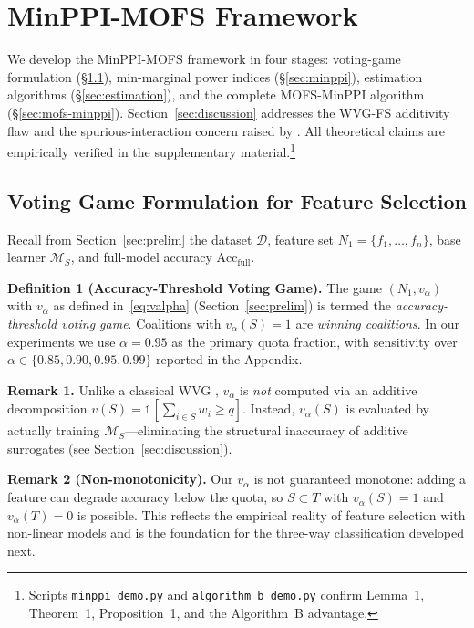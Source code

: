 \documentclass{article} %
\begin{document}
\section{MinPPI-MOFS Framework}
\label{sec:method}

We develop the MinPPI-MOFS framework in four stages: voting-game formulation (\S\ref{sec:voting-game}), min-marginal power indices (\S\ref{sec:minppi}), estimation algorithms (\S\ref{sec:estimation}), and the complete MOFS-MinPPI algorithm (\S\ref{sec:mofs-minppi}). Section~\ref{sec:discussion} addresses the WVG-FS additivity flaw and the spurious-interaction concern raised by \citet{rabitti2019shapley}. All theoretical claims are empirically verified in the supplementary material.\footnote{Scripts \texttt{minppi\_demo.py} and \texttt{algorithm\_b\_demo.py} confirm Lemma~1, Theorem~1, Proposition~1, and the Algorithm~B advantage.}

\subsection{Voting Game Formulation for Feature Selection}
\label{sec:voting-game}

Recall from Section~\ref{sec:prelim} the dataset $\mathcal{D}$, feature set $N_1 = \{f_1, \dots, f_n\}$, base learner $\mathcal{M}_S$, and full-model accuracy $\text{Acc}_{\text{full}}$.

\textbf{Definition 1 (Accuracy-Threshold Voting Game).}
The game $(N_1, v_\alpha)$ with $v_\alpha$ as defined in~\eqref{eq:valpha} (Section~\ref{sec:prelim}) is termed the \emph{accuracy-threshold voting game}. Coalitions with $v_\alpha(S) = 1$ are \emph{winning coalitions}. In our experiments we use $\alpha = 0.95$ as the primary quota fraction, with sensitivity over $\alpha \in \{0.85, 0.90, 0.95, 0.99\}$ reported in the Appendix.

\textbf{Remark 1.}
Unlike a classical WVG \citep{owen1972multilinear}, $v_\alpha$ is \emph{not} computed via an additive decomposition $v(S) = \mathbb{1}[\sum_{i \in S} w_i \geq q]$. Instead, $v_\alpha(S)$ is evaluated by actually training $\mathcal{M}_S$---eliminating the structural inaccuracy of additive surrogates (see Section~\ref{sec:discussion}).

\textbf{Remark 2 (Non-monotonicity).}
Our $v_\alpha$ is not guaranteed monotone: adding a feature can degrade accuracy below the quota, so $S \subset T$ with $v_\alpha(S) = 1$ and $v_\alpha(T) = 0$ is possible. This reflects the empirical reality of feature selection with non-linear models and is the foundation for the three-way classification developed next.
\end{document}
